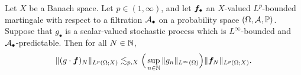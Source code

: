 \begin{thm}\label{thm:scalar-mgale-tf-bdd}
  Let $X$ be a Banach space.
  Let $p \in (1,\infty)$, and let $\bm{f}_{\bullet}$ an $X$-valued $L^p$-bounded martingale with respect to a filtration $\mathcal{A}_{\bullet}$ on a probability space $(\Omega,\mathcal{A},\mathbb{P})$.
  Suppose that $g_{\bullet}$ is a scalar-valued stochastic process which is $L^\infty$-bounded and $\mathcal{A}_{\bullet}$-predictable.
  Then for all $N \in \mathbb{N}$,
  \begin{equation*}
    \|(g \cdot \bm{f})_{N}\|_{L^p(\Omega;X)}
    \lesssim_{p,X} \Big(\sup_{n \in \mathbb{N}} \|g_{n}\|_{L^\infty(\Omega)} \Big) \|\bm{f}_{N}\|_{L^p(\Omega;X)}.
  \end{equation*}
\end{thm}

